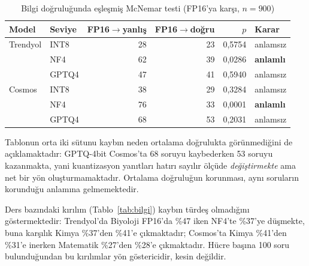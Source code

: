 \documentclass[conference]{IEEEtran}
\begin{document}
\begin{table}[htbp]
\caption{Bilgi doğruluğunda eşleşmiş McNemar testi (FP16'ya karşı, $n=900$)}
\label{tab:mcnemar}
\centering
\small
\setlength{\tabcolsep}{4pt}
\begin{tabular}{llrrrl}
\hline
Model & Seviye & FP16$\to$yanlış & FP16$\to$doğru & $p$ & Karar \\
\hline
Trendyol & INT8  & 28 & 23 & 0,5754 & anlamsız \\
         & NF4   & 62 & 39 & 0,0286 & \textbf{anlamlı} \\
         & GPTQ4 & 47 & 41 & 0,5940 & anlamsız \\
\hline
Cosmos   & INT8  & 38 & 29 & 0,3284 & anlamsız \\
         & NF4   & 76 & 33 & 0,0001 & \textbf{anlamlı} \\
         & GPTQ4 & 68 & 53 & 0,2031 & anlamsız \\
\hline
\end{tabular}
\end{table}

Tablonun orta iki sütunu kaybın neden ortalama doğrulukta görünmediğini de
açıklamaktadır: GPTQ-4bit Cosmos'ta 68 soruyu kaybederken 53 soruyu
kazanmakta, yani kuantizasyon yanıtları hatırı sayılır ölçüde
\emph{değiştirmekte} ama net bir yön oluşturmamaktadır. Ortalama doğruluğun
korunması, aynı soruların korunduğu anlamına gelmemektedir.

Ders bazındaki kırılım (Tablo~\ref{tab:bilgi}) kaybın türdeş olmadığını
göstermektedir: Trendyol'da Biyoloji FP16'da \%47 iken NF4'te \%37'ye
düşmekte, buna karşılık Kimya \%37'den \%41'e çıkmaktadır; Cosmos'ta
Kimya \%41'den \%31'e inerken Matematik \%27'den \%28'e çıkmaktadır.
Hücre başına 100 soru bulunduğundan bu kırılımlar yön göstericidir, kesin
değildir.
\end{document}
